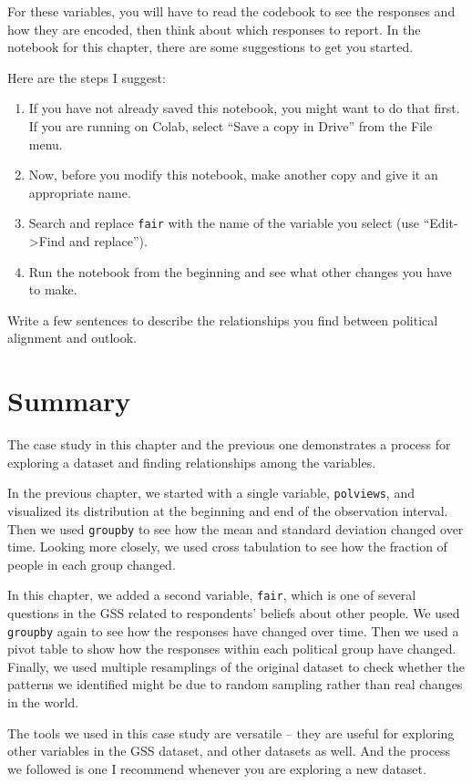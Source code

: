 For these variables, you will have to read the codebook to see the
responses and how they are encoded, then think about which responses to
report. In the notebook for this chapter, there are some suggestions to
get you started.

Here are the steps I suggest:

\begin{enumerate}
\def\labelenumi{\arabic{enumi})}
\item
  If you have not already saved this notebook, you might want to do that
  first. If you are running on Colab, select ``Save a copy in Drive''
  from the File menu.
\item
  Now, before you modify this notebook, make another copy and give it an
  appropriate name.
\item
  Search and replace \passthrough{\lstinline!fair!} with the name of the
  variable you select (use ``Edit-\textgreater Find and replace'').
\item
  Run the notebook from the beginning and see what other changes you
  have to make.
\end{enumerate}

Write a few sentences to describe the relationships you find between
political alignment and outlook.

\section{Summary}\label{summary}

The case study in this chapter and the previous one demonstrates a
process for exploring a dataset and finding relationships among the
variables.

In the previous chapter, we started with a single variable,
\passthrough{\lstinline!polviews!}, and visualized its distribution at
the beginning and end of the observation interval. Then we used
\passthrough{\lstinline!groupby!} to see how the mean and standard
deviation changed over time. Looking more closely, we used cross
tabulation to see how the fraction of people in each group changed.

In this chapter, we added a second variable,
\passthrough{\lstinline!fair!}, which is one of several questions in the
GSS related to respondents' beliefs about other people. We used
\passthrough{\lstinline!groupby!} again to see how the responses have
changed over time. Then we used a pivot table to show how the responses
within each political group have changed. Finally, we used multiple
resamplings of the original dataset to check whether the patterns we
identified might be due to random sampling rather than real changes in
the world.

The tools we used in this case study are versatile -- they are useful
for exploring other variables in the GSS dataset, and other datasets as
well. And the process we followed is one I recommend whenever you are
exploring a new dataset.

